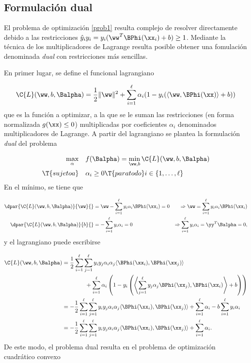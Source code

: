 \subsection{Formulación dual}
El problema de optimización \autoref{prob1} resulta complejo de resolver
directamente debido a las restricciones
$\hat{y}_i{y}_i={y}_i(\ww^T\BPhi(\xx_i)+b)\geq{}1$.  Mediante la
técnica de los multiplicadores de Lagrange \cite{LAGRANGE}
\cite{bottou} resulta posible obtener una fomulación denominada
\emph{dual} con restricciones más sencillas.

En primer lugar, se define el funcional lagrangiano

\begin{align}
  \C{L}(\ww,b,\Balpha) = \frac{1}{2} \|\ww\|^2
  + \sum_{i=1}^{\ell} \alpha_i (1-y_i(\langle\ww,\BPhi(\xx)\rangle+b))
  \label{LP}
\end{align}
que es la función a optimizar, a la que se le suman las restricciones
(en forma normalizada $g(\xx)\leq0$) multiplicadas por coeficientes
$\alpha_i$ denominados multiplicadores de Lagrange.
A partir del lagrangiano se plantea la formulación \emph{dual}
del problema

\begin{align}
  \begin{split}
    \max_\alpha &\quad f(\Balpha) = \min_{\ww,b} \C{L}(\ww,b,\Balpha)\\
    \T{sujeto a} &\quad \alpha_i \geq 0\T{ para todo } i\in\{1,\ldots,\ell\}
  \end{split}
\end{align}
En el mínimo, se tiene que

\begin{align}
  \dpar{\C{L}(\ww,b,\Balpha)}{\ww}{}
    &=\ww-\sum_{i=1}^\ell y_i\alpha_i\BPhi(\xx_i) = 0
    &\Rightarrow \ww = \sum_{i=1}^\ell y_i\alpha_i\BPhi(\xx_i)
  \label{dobleve}\\
  \dpar{\C{L}(\ww,b,\Balpha)}{b}{}
    &=-\sum_{i=1}^\ell y_i\alpha_i = 0
      &\Rightarrow \sum_{i=1}^\ell y_i\alpha_i = \yy^T\Balpha = 0,
\end{align}
y el lagrangiano puede escribirse

\begin{align*}
  \C{L}(\ww,b,\Balpha)
  & = 
    \frac{1}{2}\sum_{i=1}^\ell\sum_{j=1}^\ell y_iy_j\alpha_i\alpha_j
    \langle\BPhi(\xx_i),\BPhi(\xx_j)\rangle \\
    &\qquad\qquad +
    \sum_{i=1}^{\ell} \alpha_i \left(1-y_i\left(\left\langle
    \sum_{j=1}^\ell y_j\alpha_j\BPhi(\xx_j) ,\BPhi(\xx_i)\right\rangle
    +b\right)\right)\\
  & = 
    -\frac{1}{2}\sum_{i=1}^\ell\sum_{j=1}^\ell y_iy_j\alpha_i\alpha_j
    \langle\BPhi(\xx_i),\BPhi(\xx_j)\rangle +
    \sum_{i=1}^{\ell} \alpha_i  - b \sum_{i=1}^\ell y_i\alpha_i \\
 & = 
    -\frac{1}{2}\sum_{i=1}^\ell\sum_{j=1}^\ell y_iy_j\alpha_i\alpha_j
    \langle\BPhi(\xx_i),\BPhi(\xx_j)\rangle +
    \sum_{i=1}^{\ell} \alpha_i  .
\end{align*}
De este modo, el problema dual resulta en el problema de optimización
cuadrático convexo

